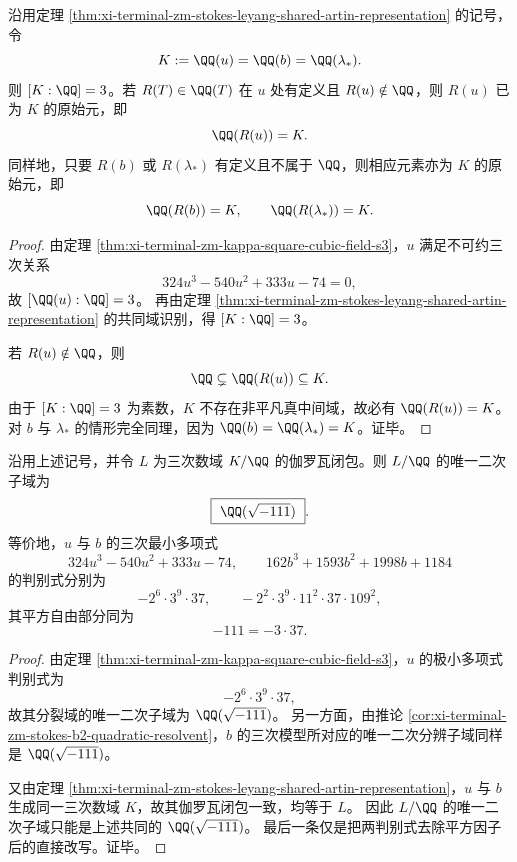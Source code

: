 \begin{corollary}\label{cor:xi-terminal-zm-leyang-cubic-rational-observable-primitivity}
沿用定理 \ref{thm:xi-terminal-zm-stokes-leyang-shared-artin-representation} 的记号，令
\[
K:=\QQ(u)=\QQ(b)=\QQ(\lambda_*).
\]
则 \([K:\QQ]=3\)。若 \(R(T)\in\QQ(T)\) 在 \(u\) 处有定义且 \(R(u)\notin\QQ\)，则 \(R(u)\) 已为 \(K\) 的原始元，即
\[
\QQ(R(u))=K.
\]
同样地，只要 \(R(b)\) 或 \(R(\lambda_*)\) 有定义且不属于 \(\QQ\)，则相应元素亦为 \(K\) 的原始元，即
\[
\QQ(R(b))=K,
\qquad
\QQ(R(\lambda_*))=K.
\]
\end{corollary}
\begin{proof}
由定理 \ref{thm:xi-terminal-zm-kappa-square-cubic-field-s3}，\(u\) 满足不可约三次关系
\[
324u^3-540u^2+333u-74=0,
\]
故 \([\QQ(u):\QQ]=3\)。
再由定理 \ref{thm:xi-terminal-zm-stokes-leyang-shared-artin-representation} 的共同域识别，得 \([K:\QQ]=3\)。

若 \(R(u)\notin\QQ\)，则
\[
\QQ\subsetneq \QQ(R(u))\subseteq K.
\]
由于 \([K:\QQ]=3\) 为素数，\(K\) 不存在非平凡真中间域，故必有 \(\QQ(R(u))=K\)。
对 \(b\) 与 \(\lambda_*\) 的情形完全同理，因为 \(\QQ(b)=\QQ(\lambda_*)=K\)。证毕。
\end{proof}

\begin{corollary}\label{cor:xi-terminal-zm-stokes-leyang-common-quadratic-resolvent}
沿用上述记号，并令 \(L\) 为三次数域 \(K/\QQ\) 的伽罗瓦闭包。则 \(L/\QQ\) 的唯一二次子域为
\[
\boxed{\ \QQ(\sqrt{-111})\ }.
\]
等价地，\(u\) 与 \(b\) 的三次最小多项式
\[
324u^3-540u^2+333u-74,
\qquad
162b^3+1593b^2+1998b+1184
\]
的判别式分别为
\[
-2^6\cdot 3^9\cdot 37,
\qquad
-2^2\cdot 3^9\cdot 11^2\cdot 37\cdot 109^2,
\]
其平方自由部分同为
\[
-111=-3\cdot 37.
\]
\end{corollary}
\begin{proof}
由定理 \ref{thm:xi-terminal-zm-kappa-square-cubic-field-s3}，\(u\) 的极小多项式判别式为
\[
-2^6\cdot 3^9\cdot 37,
\]
故其分裂域的唯一二次子域为 \(\QQ(\sqrt{-111})\)。
另一方面，由推论 \ref{cor:xi-terminal-zm-stokes-b2-quadratic-resolvent}，\(b\) 的三次模型所对应的唯一二次分辨子域同样是 \(\QQ(\sqrt{-111})\)。

又由定理 \ref{thm:xi-terminal-zm-stokes-leyang-shared-artin-representation}，\(u\) 与 \(b\) 生成同一三次数域 \(K\)，故其伽罗瓦闭包一致，均等于 \(L\)。
因此 \(L/\QQ\) 的唯一二次子域只能是上述共同的 \(\QQ(\sqrt{-111})\)。
最后一条仅是把两判别式去除平方因子后的直接改写。证毕。
\end{proof}

\endinput

